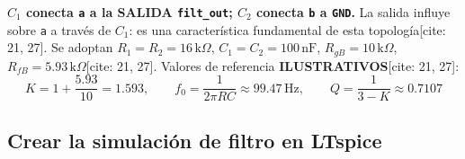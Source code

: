 \documentclass[10pt, a4paper]{article}
\begin{document}
\textbf{$C_1$ conecta \texttt{a} a la SALIDA \texttt{filt\_out}; $C_2$ conecta \texttt{b} a \texttt{GND}.} La salida influye sobre \texttt{a} a través de $C_1$: es una característica fundamental de esta topología[cite: 21, 27]. Se adoptan $R_1 = R_2 = 16\,\text{k}\Omega$, $C_1 = C_2 = 100\,\text{nF}$, $R_{gB} = 10\,\text{k}\Omega$, $R_{fB} = 5.93\,\text{k}\Omega$[cite: 21, 27]. Valores de referencia \textbf{ILUSTRATIVOS}[cite: 21, 27]:
\begin{equation}
    K = 1 + \frac{5.93}{10} = 1.593, \qquad f_0 = \frac{1}{2\pi RC} \approx 99.47\,\text{Hz}, \qquad Q = \frac{1}{3 - K} \approx 0.7107
\end{equation}

\subsection{Crear la simulación de filtro en LTspice}
\end{document}
